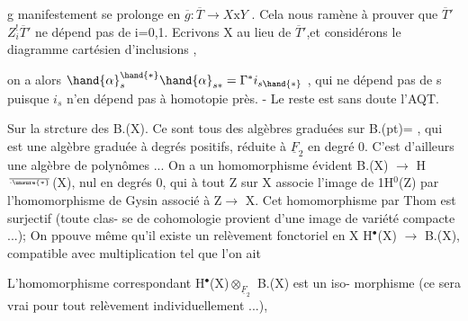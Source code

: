 g manifestement se prolonge en $\overline{g} : \overline{T} \to X\mathrm{x}Y$ . Cela nous ramène à prouver
que \hand{\unsure{$\Gamma$}}$\overline{T}'$\hand{\unsure{$\Gamma$}}$Z_i^!$$\overline{T}'$ ne dépend pas de i=0,1. Ecrivons X au lieu de $\overline{T}'$,et
considérons le diagramme cartésien d'inclusions
,

on a alors $\hand{\alpha}^{\hand{*}}_s \hand{\alpha}_{s*} = \Gamma^* i_{s\hand{*}}$ , qui ne dépend pas de s puisque $i_s$ n'en
dépend pas à homotopie près. - Le reste est sans doute l'AQT.

Sur la strcture des B.(X). Ce sont tous des algèbres graduées
sur B.(pt)=\hand{$\Lambda$} , qui est une algèbre graduée à degrés positifs, réduite
\margin{\unsure{\S}}
à $\underline{F}_2$ en degré 0. C'est d'ailleurs une algèbre de polynômes   ...
On a un homomorphisme évident B.(X) $\to$ H$^{\over{\cdot}{\unsure{*}}}$(X), nul en degrés \hand{$>$}0, qui
à tout Z sur X associe l'image de 1\hand{$\in$}H$^0$(Z) par l'homomorphisme de Gysin
associé à Z$\to$ X. Cet homomorphisme par Thom est surjectif (toute clas-%
se de cohomologie provient d'une image de variété compacte ...); 
On ppouve même qu'il existe un relèvement fonctoriel en X
H$^\bullet$(X) $\to$ B.(X), \hand{(}compatible avec multiplication\hand{)} tel que l'on ait\hand{:}

 L'homomorphisme correspondant H$^\bullet$(X)$\otimes_{\underline{F}_2}$\hand{$\Lambda$} \hand{$\simeq$}B.(X) est un iso-%
morphisme (ce sera vrai pour tout relèvement individuellement ...), 

